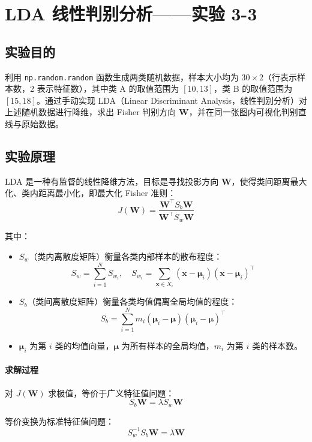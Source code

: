 \documentclass[10.5pt]{config}
\date{\today}
\begin{document}
\makeheader %

\section{LDA 线性判别分析——实验 3-3}

\subsection{实验目的}

利用 \texttt{np.random.random} 函数生成两类随机数据，样本大小均为 $30 \times 2$（行表示样本数，2 表示特征数），其中类 A 的取值范围为 $[10, 13]$，类 B 的取值范围为 $[15, 18]$。通过手动实现 LDA（Linear Discriminant Analysis，线性判别分析）对上述随机数据进行降维，求出 Fisher 判别方向 $\mathbf{W}$，并在同一张图内可视化判别直线与原始数据。

\subsection{实验原理}

LDA 是一种有监督的线性降维方法，目标是寻找投影方向 $\mathbf{W}$，使得类间距离最大化、类内距离最小化，即最大化 Fisher 准则：
$$J(\mathbf{W}) = \frac{\mathbf{W}^\top S_b \mathbf{W}}{\mathbf{W}^\top S_w \mathbf{W}}$$

其中：
\begin{itemize}
    \item $S_w$（类内离散度矩阵）衡量各类内部样本的散布程度：
    $$S_w = \sum_{i=1}^{N} S_{w_i}, \quad S_{w_i} = \sum_{\mathbf{x} \in X_i} (\mathbf{x} - \boldsymbol{\mu}_i)(\mathbf{x} - \boldsymbol{\mu}_i)^\top$$
    \item $S_b$（类间离散度矩阵）衡量各类均值偏离全局均值的程度：
    $$S_b = \sum_{i=1}^{N} m_i (\boldsymbol{\mu}_i - \boldsymbol{\mu})(\boldsymbol{\mu}_i - \boldsymbol{\mu})^\top$$
    \item $\boldsymbol{\mu}_i$ 为第 $i$ 类的均值向量，$\boldsymbol{\mu}$ 为所有样本的全局均值，$m_i$ 为第 $i$ 类的样本数。
\end{itemize}

\paragraph{求解过程}

对 $J(\mathbf{W})$ 求极值，等价于广义特征值问题：
$$S_b \mathbf{W} = \lambda S_w \mathbf{W}$$

等价变换为标准特征值问题：
$$S_w^{-1} S_b \mathbf{W} = \lambda \mathbf{W}$$
\end{document}
